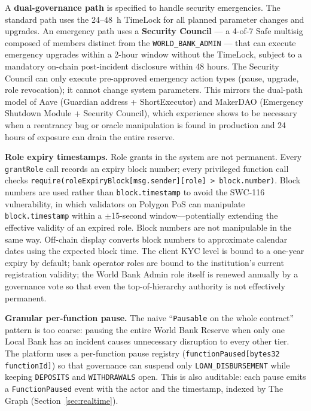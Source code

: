 \documentclass[12pt,a4paper]{report}
\begin{document}
A \textbf{dual-governance path} is specified to handle security emergencies. The standard path uses the 24--48~h TimeLock for all planned parameter changes and upgrades. An emergency path uses a \textbf{Security Council} --- a 4-of-7 Safe multisig composed of members distinct from the \texttt{WORLD\_BANK\_ADMIN} --- that can execute emergency upgrades within a 2-hour window without the TimeLock, subject to a mandatory on-chain post-incident disclosure within 48 hours. The Security Council can only execute pre-approved emergency action types (pause, upgrade, role revocation); it cannot change system parameters. This mirrors the dual-path model of Aave (Guardian address + ShortExecutor) and MakerDAO (Emergency Shutdown Module + Security Council), which experience shows to be necessary when a reentrancy bug or oracle manipulation is found in production and 24 hours of exposure can drain the entire reserve.

\textbf{Role expiry timestamps.} Role grants in the system are not permanent. Every \texttt{grantRole} call records an expiry block number; every privileged function call checks \texttt{require(roleExpiryBlock[msg.sender][role] > block.number)}. Block numbers are used rather than \texttt{block.timestamp} to avoid the SWC-116 vulnerability, in which validators on Polygon PoS can manipulate \texttt{block.timestamp} within a $\pm$15-second window---potentially extending the effective validity of an expired role. Block numbers are not manipulable in the same way. Off-chain display converts block numbers to approximate calendar dates using the expected block time. The client KYC level is bound to a one-year expiry by default; bank operator roles are bound to the institution's current registration validity; the World Bank Admin role itself is renewed annually by a governance vote so that even the top-of-hierarchy authority is not effectively permanent.

\textbf{Granular per-function pause.} The naive ``\texttt{Pausable} on the whole contract'' pattern is too coarse: pausing the entire World Bank Reserve when only one Local Bank has an incident causes unnecessary disruption to every other tier. The platform uses a per-function pause registry (\texttt{functionPaused[bytes32 functionId]}) so that governance can suspend only \texttt{LOAN\_DISBURSEMENT} while keeping \texttt{DEPOSITS} and \texttt{WITHDRAWALS} open. This is also auditable: each pause emits a \texttt{FunctionPaused} event with the actor and the timestamp, indexed by The Graph (Section~\ref{sec:realtime}).
\end{document}

